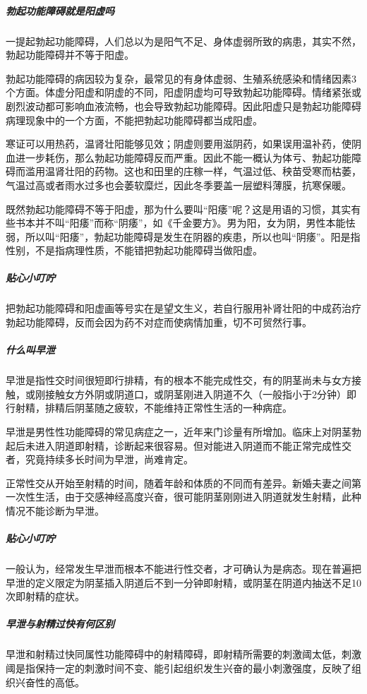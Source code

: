 \subparagraph{勃起功能障碍就是阳虚吗}

一提起勃起功能障碍，人们总以为是阳气不足、身体虚弱所致的病患，其实不然，勃起功能障碍并不等于阳虚。

勃起功能障碍的病因较为复杂，最常见的有身体虚弱、生殖系统感染和情绪因素3个方面。体虚分阳虚和阴虚的不同，阳虚阴虚均可导致勃起功能障碍。情绪紧张或剧烈波动都可影响血液流畅，也会导致勃起功能障碍。因此阳虚只是勃起功能障碍病理现象中的一个方面，不能把勃起功能障碍都当成阳虚。

寒证可以用热药，温肾壮阳能够见效；阴虚则要用滋阴药，如果误用温补药，使阴血进一步耗伤，那么勃起功能障碍反而严重。因此不能一概认为体亏、勃起功能障碍而滥用温肾壮阳的药物。这也和田里的庄稼一样，气温过低、秧苗受寒而枯萎，气温过高或者雨水过多也会萎软糜烂，因此冬季要盖一层塑料薄膜，抗寒保暖。

既然勃起功能障碍不等于阳虚，那为什么要叫“阳痿”呢？这是用语的习惯，其实有些书本并不叫“阳痿”而称“阴痿”，如《千金要方》。男为阳，女为阴，男性本能怯弱，所以叫“阳痿”，勃起功能障碍是发生在阴器的疾患，所以也叫“阴痿”。阳是指性别，不是指病理性质，不能错把勃起功能障碍当做阳虚。

\subparagraph{贴心小叮咛}

把勃起功能障碍和阳虚画等号实在是望文生义，若自行服用补肾壮阳的中成药治疗勃起功能障碍，反而会因为药不对症而使病情加重，切不可贸然行事。

\subparagraph{什么叫早泄}

早泄是指性交时间很短即行排精，有的根本不能完成性交，有的阴茎尚未与女方接触，或刚接触女方外阴或阴道口，或阴茎刚进入阴道不久（一般指小于2分钟）即行射精，排精后阴茎随之疲软，不能维持正常性生活的一种病症。

早泄是男性性功能障碍的常见病症之一，近年来门诊量有所增加。临床上对阴茎勃起后未进入阴道即射精，诊断起来很容易。但对能进入阴道而不能正常完成性交者，究竟持续多长时间为早泄，尚难肯定。

正常性交从开始至射精的时间，随着年龄和体质的不同而有差异。新婚夫妻之间第一次性生活，由于交感神经高度兴奋，很可能阴茎刚刚进入阴道就发生射精，此种情况不能诊断为早泄。

\subparagraph{贴心小叮咛}

一般认为，经常发生早泄而根本不能进行性交者，才可确认为是病态。现在普遍把早泄的定义限定为阴茎插入阴道后不到一分钟即射精，或阴茎在阴道内抽送不足10次即射精的症状。

\subparagraph{早泄与射精过快有何区别}

早泄和射精过快同属性功能障碍中的射精障碍，即射精所需要的刺激阈太低，刺激阈是指保持一定的刺激时间不变、能引起组织发生兴奋的最小刺激强度，反映了组织兴奋性的高低。

